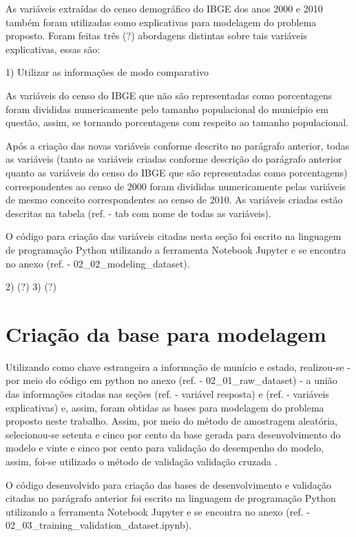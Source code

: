 As variáveis extraídas do censo demográfico do IBGE dos anos 2000 e 2010 também foram utilizadas como explicativas para modelagem do problema proposto. Foram feitas três (?) abordagens distintas sobre tais variáveis explicativas, essas são:

1) Utilizar as informações de modo comparativo

As variáveis do censo do IBGE que não são representadas como porcentagens foram divididas numericamente pelo tamanho populacional do município em questão, assim, se tornando porcentagens com respeito ao tamanho populacional.

Após a criação das novas variáveis conforme descrito no parágrafo anterior, todas as variáveis (tanto as variáveis criadas conforme descrição do parágrafo anterior quanto as variáveis do censo do IBGE que são representadas como porcentagens) correspondentes ao censo de 2000 foram divididas numericamente pelas variáveis de mesmo conceito correspondentes ao censo de 2010. As variáveis criadas estão descritas na tabela (ref. - tab com nome de todas as variáveis).

O código para criação das variáveis citadas nesta seção foi escrito na linguagem de programação Python utilizando a ferramenta Notebook Jupyter e se encontra no anexo (ref. - 02_02_modeling_dataset).

2) (?)
3) (?)

\section{Criação da base para modelagem}
\label{sec:criacao_da_base_para_modelagem}

Utilizando como chave estrangeira a informação de munício e estado, realizou-se - por meio do código em python no anexo (ref. - 02_01_raw_dataset) - a união das informações citadas nas seções (ref. - variável resposta) e (ref. - variáveis explicativas) e, assim, foram obtidas as bases para modelagem do problema proposto neste trabalho. Assim, por meio do método de amostragem aleatória, selecionou-se setenta e cinco por cento da base gerada para desenvolvimento do modelo e vinte e cinco por cento para validação do desempenho do modelo, assim, foi-se utilizado o método de validação validação cruzada \citet{Wesllen2017:MSc}.

O código desenvolvido para criação das bases de desenvolvimento e validação citadas no parágrafo anterior foi escrito na linguagem de programação Python utilizando a ferramenta Notebook Jupyter e se encontra no anexo (ref. - 02_03_training_validation_dataset.ipynb).

